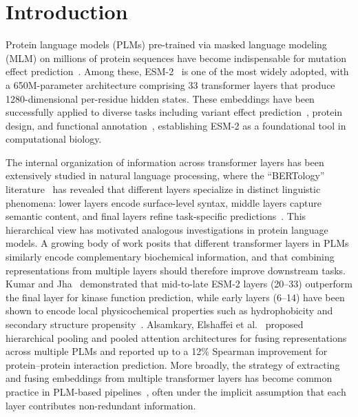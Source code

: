 \documentclass[numbered,webpdf,modern,large]{oup-authoring-template}
\newcommand{\rev}[1]{\textcolor{red}{#1}}
\begin{document}
\maketitle

\section{Introduction}

Protein language models (PLMs) pre-trained via masked language modeling (MLM) on
millions of protein sequences have become indispensable for mutation effect
prediction~\cite{rives2021biological,meier2021language,lin2023evolutionary}.
Among these, ESM-2~\cite{lin2023evolutionary}
is one of the most widely adopted, with a 650M-parameter architecture comprising 33
transformer layers that produce 1280-dimensional per-residue hidden states. These
embeddings have been successfully applied to diverse tasks including variant effect
prediction~\cite{frazer2021disease,hie2021learning}, protein design, and functional
annotation~\cite{elnaggar2022prottrans,brandes2022proteinbert}, establishing ESM-2 as a
foundational tool in computational biology.

The internal organization of information across transformer layers has been
extensively studied in natural language processing, where the ``BERTology''
literature~\cite{rogers2021bertology,tenney2019bert} has revealed that different layers specialize
in distinct linguistic phenomena: lower layers encode surface-level syntax, middle
layers capture semantic content, and final layers refine task-specific
predictions~\rev{\cite{tenney2019bert,rogers2021bertology}}.
This hierarchical view has motivated analogous investigations in protein language
models. A growing body of work posits that different transformer layers in PLMs
similarly encode complementary biochemical information, and that combining
representations from multiple layers should therefore improve downstream tasks.
Kumar and Jha~\cite{kumar2025} demonstrated that mid-to-late ESM-2 layers (20--33)
outperform the final layer for kinase function prediction, while early layers
(6--14) have been shown to encode local physicochemical properties such as
hydrophobicity and secondary structure propensity~\cite{detlefsen2022}.
Alsamkary, Elshaffei et al.~\cite{elshaffei2025} proposed hierarchical pooling and
pooled attention architectures for fusing representations across multiple PLMs and
reported up to a 12\% Spearman improvement for protein--protein interaction
prediction. More broadly, the strategy of extracting and fusing embeddings from
multiple transformer layers has become common practice in PLM-based
pipelines~\cite{rao2019tape}, often under the implicit assumption that each layer
contributes non-redundant information.
\end{document}
